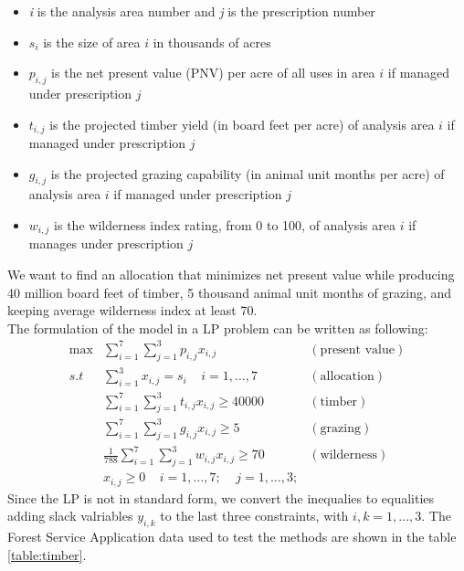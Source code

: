 \documentclass[a4paper,10 pt,titlepage,twoside]{book}
\theoremstyle{plain}
\theoremstyle{definition}
\theoremstyle{remark}
\begin{document}
\begin{itemize}
	\item \textit{i} is the analysis area number and \textit{j} is the prescription number
	\item $s_{i}$ is the size of area $i$ in thousands of acres
	\item $p_{i,j}$ is the net present value (PNV) per acre of all uses in area $i$ if managed under prescription $j$
	\item $t_{i,j}$ is the projected timber yield (in board feet per acre) of analysis area $i$ if managed under prescription $j$
	\item $g_{i,j}$ is the projected grazing capability (in animal unit months per acre) of analysis area $i$ if managed under prescription $j$
	\item $w_{i,j}$ is the wilderness index rating, from 0 to 100, of analysis area $i$ if manages under prescription $j$
\end{itemize}
We want to find an allocation that minimizes net present value while producing 40 million board feet of timber, 5 thousand animal unit months of grazing, and keeping average wilderness index at least 70.\\
The formulation of the model in a LP problem can be written as following:
\begin{align*}
\max&\sum_{i=1}^{7}\sum_{j=1}^{3} p_{i,j}x_{i,j}&(\text{present value})\\
s.t& \sum_{i=1}^{3}x_{i,j}=s_{i}\;\;\;\;i = 1, \dots,7&(\text{allocation})\\
&\sum_{i=1}^{7}\sum_{j=1}^{3} t_{i,j}x_{i,j}\geq 40000&(\text{timber})\\
&\sum_{i=1}^{7}\sum_{j=1}^{3} g_{i,j}x_{i,j}\geq5&(\text{grazing})\\
&\frac{1}{788}\sum_{i=1}^{7}\sum_{j=1}^{3} w_{i,j}x_{i,j}\geq 70&(\text{wilderness})\\
&x_{i,j}\geq 0 \;\;\;\;i = 1,\dots,7;\;\;\;\;j = 1,\dots,3;
\end{align*}
Since the LP is not in standard form, we convert the inequalies to equalities adding slack valriables $y_{i,k}$ to the last three constraints, with $i, k = 1, \dots, 3$. The Forest Service Application data used to test the methods are shown in the table \ref{table:timber}.
\end{document}
